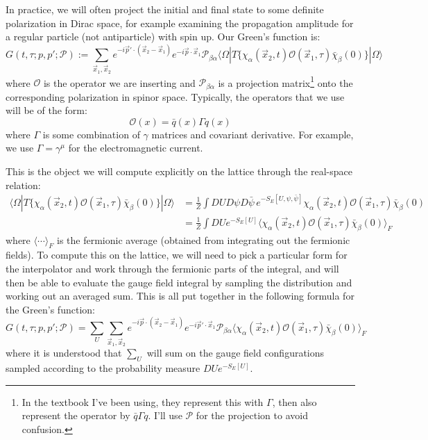 \documentclass[11pt, oneside]{article}   	%
\theoremstyle{definition}
\begin{document}
In practice, we will often project the initial and final state to some definite polarization in Dirac space, for example examining  
the propagation amplitude for a regular particle (not antiparticle) with spin up. Our Green's function is:
\begin{equation}
	G(t, \tau; p, p'; \mathcal P) := \sum_{\vec x_1, \vec x_2} e^{-i\vec p'\cdot (\vec x_2 - \vec x_1)}
	e^{-i\vec p\cdot\vec x_1}\mathcal P_{\beta\alpha}\langle\Omega | T\{\chi_\alpha(\vec x_2, t)\mathcal O (\vec x_1, \tau)
	\bar\chi_\beta(0)\}| \Omega\rangle
\end{equation}
where $\mathcal O$ is the operator we are inserting and $\mathcal P_{\beta\alpha}$ is a projection matrix\footnote{In the 
textbook I've been using, they represent this with $\Gamma$, then also represent the operator by $\bar q\Gamma q$. I'll use 
$\mathcal P$ for the projection to avoid confusion.} onto the corresponding polarization in 
spinor space. Typically, the operators that we use will be of the form:
\begin{equation}
	\mathcal O(x) = \bar q(x) \Gamma q(x)
\end{equation}
where $\Gamma$ is some combination of $\gamma$ matrices and covariant derivative. For example, we use $\Gamma = 
\gamma^\mu$ for the electromagnetic current. 

This is the object we will compute explicitly on the lattice through the real-space relation:
\begin{align}
	\langle\Omega | T\{\chi_\alpha(\vec x_2, t)\mathcal O(\vec x_1, \tau)\bar\chi_\beta(0)\} |\Omega\rangle &= \frac{1}{Z}\int 
	DU D\psi D\bar\psi\,e^{-S_E[U, \psi, \bar\psi]}\chi_\alpha(\vec x_2, t)\mathcal O(\vec x_1, \tau)\bar\chi_\beta(0) \\
	&= \frac{1}{Z}\int DU e^{-S_E[U]} \langle\chi_\alpha(\vec x_2, t)\mathcal O(\vec x_1, \tau)\bar\chi_\beta(0)\rangle_F
\end{align}
where $\langle\cdots\rangle_F$ is the fermionic average (obtained from integrating out the fermionic fields). 
To compute this on the lattice, we will need to pick a particular form for the interpolator and work through the fermionic parts of the integral, and 
will then be able to evaluate the gauge field integral by sampling the distribution and working out an averaged sum. This is all put together in the 
following formula for the Green's function:
\begin{equation}
	G(t, \tau; p, p'; \mathcal P) = \sum_U\sum_{\vec x_1, \vec x_2} e^{-i\vec p\cdot (\vec x_2 - \vec x_1)} e^{-i\vec p'\cdot\vec 
	x_1}\mathcal P_{\beta\alpha}\langle\chi_\alpha(\vec x_2, t)\mathcal O(\vec x_1, \tau)\bar\chi_\beta(0)\rangle_F~
	\label{eq:greens_fn_reduced}
\end{equation}
where it is understood that $\sum_U$ will sum on the gauge field configurations sampled according to the probability measure $DU e^{-S_E[U]}$. 
\end{document}
